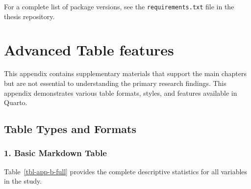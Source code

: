 \documentclass[
  letterpaper,
  oneside,
  openany]{MastersDoctoralThesis}
\begin{document}
For a complete list of package versions, see the
\texttt{requirements.txt} file in the thesis repository.

\chapter{Advanced Table features}\label{sec-app-b}

This appendix contains supplementary materials that support the main
chapters but are not essential to understanding the primary research
findings. This appendix demonstrates various table formats, styles, and
features available in Quarto.

\section{Table Types and Formats}\label{sec-app-b-tables}

\subsection{1. Basic Markdown Table}\label{sec-app-b-basic}

Table~\ref{tbl-app-b-full} provides the complete descriptive statistics
for all variables in the study.
\end{document}
